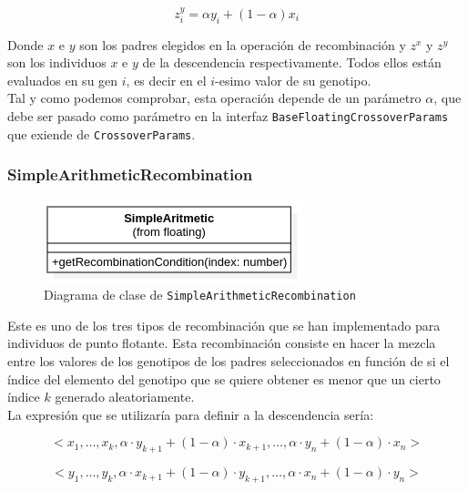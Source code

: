 \begin{equation}
    z^y_i = \alpha y_i + (1 - \alpha)x_i
\end{equation}

Donde $x$ e $y$ son los padres elegidos en la operación de recombinación y $z^x$ y $z^y$ son los individuos $x$ e $y$ de la descendencia respectivamente. Todos ellos están evaluados en su gen $i$, es decir en el $i$-esimo valor de su genotipo. \\

Tal y como podemos comprobar, esta operación depende de un parámetro $\alpha$, que debe ser pasado como parámetro en la interfaz \texttt{BaseFloatingCrossoverParams} que exiende de \texttt{CrossoverParams}.

\subsubsection{SimpleArithmeticRecombination}

\begin{figure}[ht]
    \centering
    \includegraphics[scale=0.7]{mem/images/cap-4/4.2.6(Crossover)/SimpleArithmetic.png}
    \caption{Diagrama de clase de \texttt{SimpleArithmeticRecombination}}
    \label{fig:my_label}
\end{figure}


Este es uno de los tres tipos de recombinación que se han implementado para individuos de punto flotante. Esta recombinación consiste en hacer la mezcla entre los valores de los genotipos de los padres seleccionados en función de si el índice del elemento del genotipo que se quiere obtener es menor que un cierto índice $k$ generado aleatoriamente. \\

La expresión que se utilizaría para definir a la descendencia sería:

\begin{equation}
    <x_1, \dots, x_k, \alpha \cdot y_{k+1} + (1 - \alpha) \cdot x_{k+1}, \dots, \alpha \cdot y_n + (1 - \alpha) \cdot x_n >
\end{equation}

\begin{equation}
    <y_1, \dots, y_k, \alpha \cdot x_{k+1} + (1 - \alpha) \cdot y_{k+1}, \dots, \alpha \cdot x_n + (1 - \alpha) \cdot y_n >
\end{equation}

